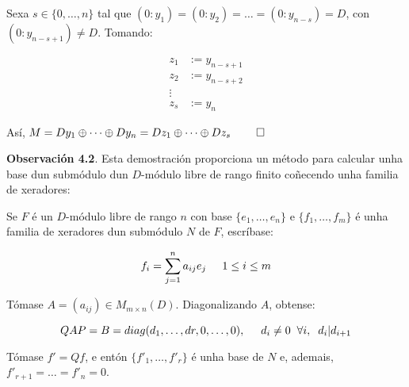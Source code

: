 \documentclass[twoside]{report}
\theoremstyle{mystyle}
\begin{document}
\noindent Sexa $s \in \{0, \dots, n\}$ tal que $(0 : y_{1}) = (0 : y_{2}) = \dots = (0 : y_{n-s}) = D$, con $(0 : y_{n-s+1}) \neq D$. Tomando:

\begin{align*}
    z_{1} & := y_{n-s+1}\\
    z_{2} & := y_{n-s+2} \\
    \vdots & \\
    z_{s} & := y_{n}
\end{align*}

\vspace{3mm}

\noindent Así, $M = Dy_{1} \oplus \cdots \oplus Dy_{n} = Dz_{1} \oplus \cdots \oplus Dz_{s} \hspace{8mm} \square$

\vspace{3mm}

\noindent \textbf{Observación 4.2}. Esta demostración proporciona un método para calcular unha base dun submódulo dun $D$-módulo libre de rango finito coñecendo unha familia de xeradores:\\

\begin{mdframed}[linecolor = classicrose, linewidth = 1mm]

\noindent Se $F$ é un $D$-módulo libre de rango $n$ con base $\{e_{1}, \dots, e_{n}\}$ e $\{f_{1}, \dots, f_{m}\}$ é unha familia de xeradores dun submódulo $N$ de $F$, escríbase:

$$f_{i} = \displaystyle \sum_{j = 1}^{n}a_{ij}e_{j} \hspace{5mm} 1 \leq i \leq m$$

\vspace{3mm}

\noindent Tómase $A = (a_{ij}) \in M_{m \times n}(D)$. Diagonalizando $A$, obtense:

$$QAP = B = diag(d_{1}, \dots, d{r}, 0, \dots, 0), \hspace{5mm} d_{i} \neq 0 \hspace{2mm} \forall i, \hspace{2mm} d_{i} | d_{i+1}$$

\vspace{2mm}

\noindent Tómase $f' = Qf$, e entón $\{f'_{1}, \dots, f'_{r}\}$ é unha base de $N$ e, ademais, $f'_{r+1} = \dots = f'_{n} = 0$.\\

\end{mdframed}
\end{document}

